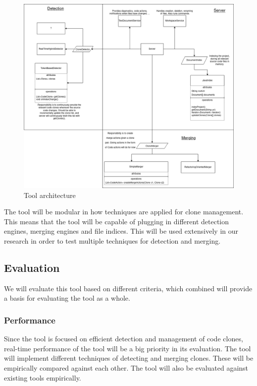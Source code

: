 \documentclass[12pt]{article}
\begin{document}
\begin{figure}
	\includegraphics[width=\textwidth]{images/ToolArchitecture.png}
	\caption{Tool architecture}
	\label{fig:architecture}
\end{figure}

The tool will be modular in how techniques are applied for clone management. This
means that the tool will be capable of plugging in different detection engines, merging
engines and file indices. This will be used extensively in our research in order to test
multiple techniques for detection and merging.

\subsection{Evaluation}

We will evaluate this tool based on different criteria, which combined will provide a
basis for evaluating the tool as a whole.

\subsubsection{Performance}

Since the tool is focused on efficient detection and management of code clones, real-time
performance of the tool will be a big priority in its evaluation. The tool will implement
different techniques of detecting and merging clones. These will be empirically compared
against each other. The tool will also be evaluated against existing tools empirically.
\end{document}
